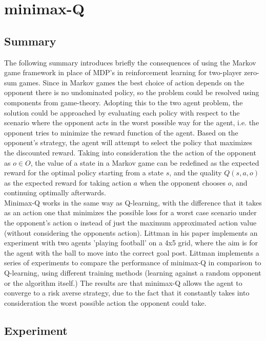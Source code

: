 \documentclass[a4paper,10pt]{article}
\begin{document}
\section{minimax-Q}
\subsection{Summary}
The following summary introduces briefly the consequences of using the Markov game framework in place of MDP's in reinforcement learning for two-player zero-sum games.
Since in Markov games the best choice of action depends on the opponent there is no undominated policy, so the problem could be resolved using components from game-theory. Adopting this to the two agent problem, the solution could be approached by evaluating each policy with respect to the scenario where the opponent acts in the worst possible way for the agent, i.e. the opponent tries to minimize the reward function of the agent. Based on the opponent's strategy, the agent will attempt to select the policy that maximizes the discounted reward. Taking into consideration the the action of the opponent as $o \in O$, the value of a state in a Markov game can be redefined as the expected reward for the optimal policy starting from a state $s$, and the quality $Q(s,a,o)$ as the expected reward for taking action $a$ when the opponent chooses $o$, and continuing optimally afterwards. \\
Minimax-Q works in the same way as Q-learning, with the difference that it takes as an action one that minimizes the possible loss for a worst case scenario under the opponent's action o instead of just the maximum approximated action value (without considering the opponents action).
Littman in his paper implements an experiment with two agents 'playing football' on a 4x5 grid, where the aim is for the agent with the ball to move into the correct goal post. Littman implements a series of experiments to compare the performance of minimax-Q in comparison to Q-learning, using different training methods (learning against a random opponent or the algorithm itself.) The results are that minimax-Q allows the agent to converge to a risk averse strategy, due to the fact that it constantly takes into consideration the worst possible action the opponent could take. 


\subsection{Experiment}
\end{document}
